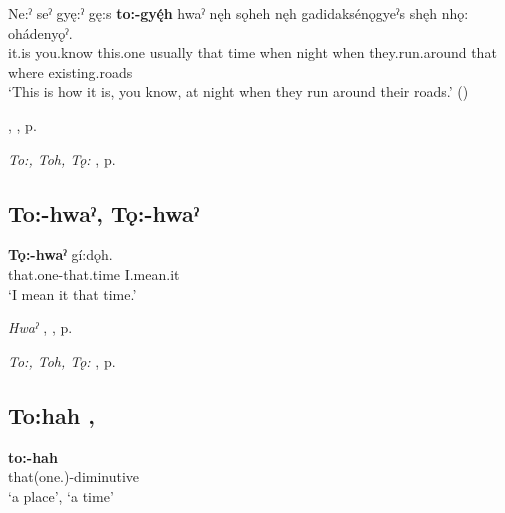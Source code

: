 \ea
\label{ex:tpart87}
\gll Ne:ˀ seˀ gyę:ˀ gę:s \textbf{to:-gyę́h} hwaˀ nęh sǫheh nęh gadidaksénǫgyeˀs shęh nhǫ: ohádenyǫˀ.\\
it.is you.know this.one usually that time when night when they.run.around that where existing.roads\\
\glt ‘This is how it is, you know, at night when they run around their roads.’ (\cite{mithun_how_1980})
\z

\begin{CayugaRelated}
\item {} , , p. \pageref{p:[-gyęh]}\\
\item \textit{To:, Toh, Tǫ:} , p. \pageref{p:[to:] ‘that one’}
\end{CayugaRelated}


\subsection*{\textbf{To:-hwaˀ, Tǫ:-hwaˀ} } \label{p:[tǫ:-hwaˀ]}

\ea
\label{ex:tpart104}
\gll \textbf{Tǫ:-hwaˀ} gí:dǫh.\\
that.one-that.time I.mean.it\\
\glt ‘I mean it that time.’
\z

\begin{CayugaRelated}
\item \textit{Hwaˀ} , , p. \pageref{p:[hwaˀ]}\\
\item \textit{To:, Toh, Tǫ:} , p. \pageref{p:[to:] ‘that one’}
\end{CayugaRelated}


\subsection*{\textbf{To:hah} , } \label{p:[to:hah]}

\ea
\label{ex:tpart88}
\gll \textbf{to:-hah}\\
that(one.)-diminutive\\
\glt ‘a place’, ‘a time’
\z

